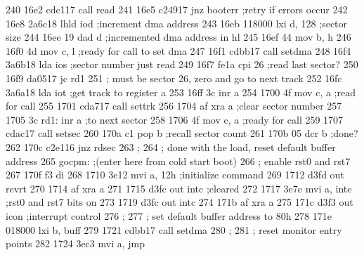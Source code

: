 240      16e2 cdc117               call     read
241      16e5 c24917               jnz      booterr    ;retry if errors occur
242      16e8 2a6c18               lhld     iod        ;increment dma address
243      16eb 118000               lxi      d, 128     ;sector size
244      16ee 19                   dad      d          ;incremented dma address in hl
245      16ef 44                   mov      b, h
246      16f0 4d                   mov      c, l       ;ready for call to set dma
247      16f1 cdbb17               call     setdma
248      16f4 3a6b18               lda      ios        ;sector number just read
249      16f7 fe1a                 cpi      26         ;read last sector?
250      16f9 da0517               jc       rd1
251                       ;        must be sector 26, zero and go to next track
252      16fc 3a6a18               lda      iot        ;get track to register a
253      16ff 3c                   inr      a
254      1700 4f                   mov      c, a       ;read for call
255      1701 cda717               call     settrk
256      1704 af                   xra      a          ;clear sector number
257      1705 3c          rd1:     inr      a          ;to next sector
258      1706 4f                   mov      c, a       ;ready for call
259      1707 cdac17               call     setsec
260      170a c1                   pop      b          ;recall sector count
261      170b 05                   dcr      b          ;done?
262      170c c2e116               jnz      rdsec
263                       ;
264                       ;        done with the load, reset default buffer address
265                       gocpm:   ;(enter here from cold start boot)
266                       ;        enable rst0 and rst7
267      170f f3                   di
268      1710 3e12                 mvi      a, 12h     ;initialize command
269      1712 d3fd                 out      revrt
270      1714 af                   xra      a
271      1715 d3fc                 out      intc       ;cleared
272      1717 3e7e                 mvi      a, inte    ;rst0 and rst7 bits on
273      1719 d3fc                 out      intc
274      171b af                   xra      a
275      171c d3f3                 out      icon       ;interrupt control
276                       ;
277                       ;        set default buffer address to 80h
278      171e 018000               lxi      b, buff
279      1721 cdbb17               call     setdma
280                       ;
281                       ;        reset monitor entry points
282      1724 3ec3                 mvi      a, jmp
